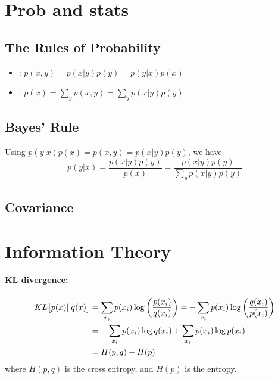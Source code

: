 \documentclass[11pt]{article}
\begin{document}
\section{Prob and stats}
\subsection{The Rules of Probability}
\begin{itemize}
  \item {}: $p(x, y) = p(x|y) p(y) = p(y|x) p(x)$
  \item {}: $p(x) = \sum\limits_y p(x, y) = \sum\limits_y p(x | y) p(y)$
\end{itemize}

\subsection{Bayes' Rule}
Using $p(y|x) p(x) = p(x,y) = p(x|y) p(y)$, we have
\begin{equation}
  p(y|x) = \frac{p(x|y) p(y)}{p(x)} = \frac{p(x|y) p(y)}{\sum\limits_y p(x|y) p(y)}
\end{equation}

\subsection{Covariance}


\section{Information Theory}
\paragraph{KL divergence:}
\begin{align}
  KL\big[p(x) || q(x)\big] &= \sum_{x_i} p(x_i) \log\left(\frac{p(x_i)}{q(x_i)} \right)
                             = -\sum_{x_i} p(x_i) \log\left(\frac{q(x_i)}{p(x_i)}
                             \right) \nonumber\\ 
                           &= -\sum_{x_i} p(x_i) \log q(x_i) + \sum_{x_i} p(x_i) \log
                             p(x_i) \nonumber\\ 
                           &= H(p,q) - H(p)
\end{align}
where $H(p,q)$ is the cross entropy, and $H(p)$ is the entropy.
\end{document}
